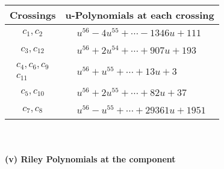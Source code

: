 \documentclass[1p]{elsarticle_modified}
\theoremstyle{definition}
\begin{document}
\begin{tabular}{m{50pt}|m{274pt}}
Crossings & \hspace{64pt}u-Polynomials at each crossing \\
\hline $$\begin{aligned}c_{1},c_{2}\end{aligned}$$&$\begin{aligned}
&u^{56}-4 u^{55}+\cdots-1346 u+111
\end{aligned}$\\
\hline $$\begin{aligned}c_{3},c_{12}\end{aligned}$$&$\begin{aligned}
&u^{56}+2 u^{54}+\cdots+907 u+193
\end{aligned}$\\
\hline $$\begin{aligned}c_{4},c_{6},c_{9}\\c_{11}\end{aligned}$$&$\begin{aligned}
&u^{56}+u^{55}+\cdots+13 u+3
\end{aligned}$\\
\hline $$\begin{aligned}c_{5},c_{10}\end{aligned}$$&$\begin{aligned}
&u^{56}+2 u^{55}+\cdots+82 u+37
\end{aligned}$\\
\hline $$\begin{aligned}c_{7},c_{8}\end{aligned}$$&$\begin{aligned}
&u^{56}- u^{55}+\cdots+29361 u+1951
\end{aligned}$\\
\hline
\end{tabular}\\~\\
\newpage\renewcommand{\arraystretch}{1}
\flushleft \textbf{(v) Riley Polynomials at the component}\newline \\
\end{document}
